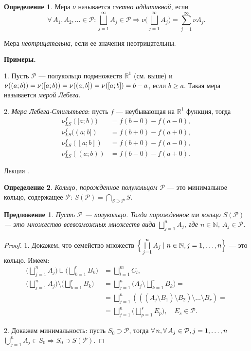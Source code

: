 \documentclass[12pt,titlepage]{article}
\newcounter{lec}
\renewcommand{\thelec}{\arabic{lec}}
\newcommand*{\lecture}{\refstepcounter{lec}\vspace{20pt}
\begin{center}{\rmfamily\textsc{Лекция \thelec.}}
\end{center}}
\newcounter{tema}
\newcommand{\prim}{\vspace{5pt}\noindent\textbf{Примеры.}}
\newtheorem{predl}{Предложение}[tema]
\theoremstyle{definition}
\newtheorem{defen}{Определение}[tema]
\newcommand*{\p}[1]{#1\nobreak\discretionary{}{\hbox{$\mathsurround=0pt #1$}}{}}
\begin{document}
\begin{defen}
Мера $\nu$ называется \emph{счетно аддитивной}, если $$\forall\,
A_1,A_2,\ldots\in\mathcal{P} : \bigsqcup\limits_{j=1}^\infty
A_j\in\mathcal{P} \Rightarrow \nu\Big(\bigsqcup\limits_{j=1}^\infty
A_j\Big)=\sum\limits_{j=1}^\infty\nu A_j.$$

Мера \emph{неотрицательна}, если ее значения неотрицательны.
\end{defen}

\prim

1. Пусть $\mathcal{P}$ --- полукольцо подмножеств $\mathbb{R}^1$
(см. выше) и $\nu((a;b))\p=\nu([a;b))=\nu((a;b])=\nu([a;b])=b-a$,
если $b\geqslant a$. Такая мера называется \emph{мерой Лебега}.

2. \emph{Мера Лебега-Стильтьеса}: пусть $f$ --- неубывающая на
$\mathbb{R}^1$ функция, тогда
\begin{align*}
\nu_{LS}^f([a;b))&=f(b-0)-f(a-0),\\
\nu_{LS}^f((a;b])&=f(b+0)-f(a+0),\\
\nu_{LS}^f([a;b])&=f(b+0)-f(a-0),\\
\nu_{LS}^f((a;b))&=f(b-0)-f(a+0).
\end{align*}

\lecture

\begin{defen}
\emph{Кольцо, порожденное полукольцом $\mathcal{P}$} --- это
минимальное кольцо, содержащее $\mathcal{P}$:
$S(\mathcal{P})=\bigcap\limits_{S\supset\mathcal{P}}S$.
\end{defen}

\begin{predl}
Пусть $\mathcal{P}$ --- полукольцо. Тогда порожденное им кольцо
$S(\mathcal{P})$ --- это множество всевозможных множеств вида
$\bigsqcup\limits_{j=1}^n A_j$, где $n\in\mathbb{N}$,
$A_j\in\mathcal{P}$.
\end{predl}

\begin{proof}
1. Докажем, что семейство множеств $\Big\{\bigsqcup\limits_{j=1}^n
A_j\mid n\p\in\mathbb{N}, j=1,\ldots,n \Big\}$ --- это кольцо.
Имеем:
\begin{align*}
\Big(\bigsqcup\limits_{j=1}^n
A_j\Big)\sqcup\Big(\bigsqcup\limits_{k=1}^r
B_k\Big)&=\bigsqcup\limits_{l=1}^m C_l,\\
\Big(\bigsqcup\limits_{j=1}^n A_j\Big)\setminus
\Big(\bigsqcup\limits_{k=1}^r B_k\Big)&=
\bigsqcup\limits_{j=1}^n\Big(A_j\setminus\bigsqcup\limits_{k=1}^r
B_k\Big)=\\
&=\bigsqcup\limits_{j=1}^n (((A_j\setminus B_1)\setminus
B_2)\setminus\ldots\setminus
B_r)=\\
&=\bigsqcup\limits_{j=1}^n\Big(\bigsqcup\limits_{p=1}^s
E_p\Big),\quad E_s\in\mathcal{P}.
\end{align*}

2. Докажем минимальность: пусть $S_0\supset \mathcal{P}$, тогда
$\forall\, n, \forall \,A_j\in\mathcal{P}, j\p=1,\ldots,n$ \;
$\bigcup\limits_{j=1}^n A_j\in S_0\Rightarrow S_0\supset
S(\mathcal{P})$.
\end{proof}
\end{document}
